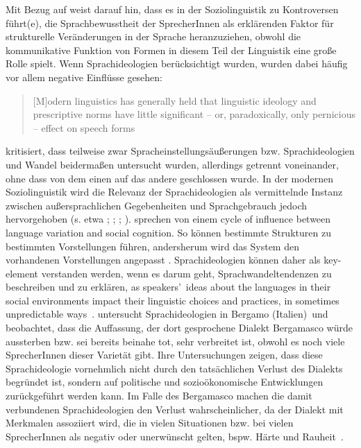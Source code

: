 Mit Bezug auf \citet{Errington.1985} weist \citet[12--13]{Woolard1998} darauf hin, dass es in der Soziolinguistik zu Kontroversen f{\"u}hrt(e), die Sprachbewusstheit der SprecherInnen als erkl{\"a}renden Faktor f{\"u}r strukturelle Ver{\"a}nderungen in der Sprache heranzuziehen, obwohl die kommunikative Funktion von Formen in diesem Teil der Linguistik eine gro{\ss}e Rolle spielt. 
Wenn Sprachideologien berücksichtigt wurden, wurden dabei häufig vor allem negative Einflüsse gesehen:
\begin{quote}[M]odern linguistics has generally held that linguistic ideology and prescriptive norms have little significant -- or, paradoxically, only pernicious -- effect on speech forms~\citep[69]{Woolard1994}\end{quote}
\citet[161]{Milroy2004} kritisiert, dass teilweise zwar %
Spracheinstellungsäußerungen %
bzw. {Sprach\-ideo\-lo\-gien} und Wandel beidermaßen untersucht wurden, allerdings getrennt voneinander, ohne dass von dem einen auf das andere geschlossen wurde. 
In der modernen Soziolinguistik wird die Relevanz der Sprachideologien als vermittelnde Instanz zwischen außersprachlichen Gegebenheiten und Sprachgebrauch jedoch hervorgehoben (s. etwa \citealp{Silverstein.1985}; \citealp{Irvine2000}; \citealp{Woolard2008}; \citealp{Eckert2012}). 
\citet[7]{Garrett2003} sprechen von einem {\glqq}cycle of influence between language variation and social cognition{\grqq}. 
So können bestimmte Strukturen zu bestimmten Vorstellungen f{\"u}hren, andersherum wird das System den vorhandenen Vorstellungen angepasst \citep[s.][12]{Woolard1998}.
Sprachideologien k{\"o}nnen daher als \glqq key-element\grqq{} verstanden werden, wenn es darum geht, Sprachwandeltendenzen zu beschreiben und zu erkl{\"a}ren, \glqq as speakers'~ideas about the languages in their social environments impact their linguistic choices and practices, in sometimes unpredictable ways\grqq{}~\citep[47]{Cavanaugh.2013}. 
\citet{Cavanaugh.2013} untersucht Sprachideologien in Bergamo (Italien)~und beobachtet, dass die Auffassung, der dort gesprochene Dialekt Bergamasco w{\"u}rde aussterben bzw. sei bereits beinahe tot, sehr verbreitet ist, obwohl es noch viele SprecherInnen dieser Variet{\"a}t gibt. 
Ihre Untersuchungen zeigen, dass diese Sprachideologie vornehmlich nicht durch den tats{\"a}chlichen Verlust des Dialekts begr{\"u}ndet ist, sondern auf politische und sozio{\"o}konomische Entwicklungen zur{\"u}ckgef{\"u}hrt werden kann. 
Im Falle des Bergamasco machen die damit verbundenen Sprachideologien den Verlust wahrscheinlicher, da der Dialekt mit Merkmalen assoziiert wird, die in vielen Situationen bzw. bei vielen SprecherInnen als negativ oder unerw{\"u}nscht gelten, bspw. H{\"a}rte und Rauheit~\citep[s.][51]{Cavanaugh.2013}.

